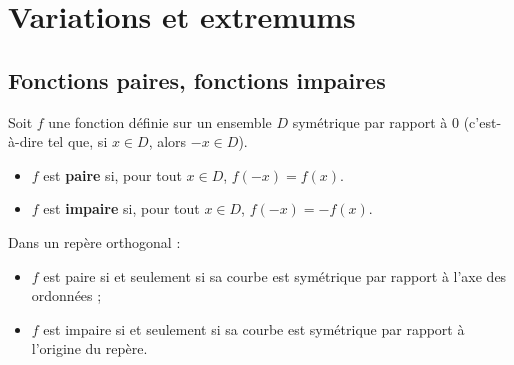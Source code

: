 \chapter{Variations et extremums}

\section{Fonctions paires, fonctions impaires}

\begin{defin}
	Soit $f$ une fonction définie sur un ensemble $D$ symétrique par rapport à $0$ (c'est-à-dire tel que, si $x \in D$, alors $-x \in D$).
	\begin{itemize}
		\item $f$ est \textbf{paire} si, pour tout $x \in D$, $f(-x) = f(x)$.
		\item $f$ est \textbf{impaire} si, pour tout $x \in D$, $f(-x) = -f(x)$.
	\end{itemize}
\end{defin}

\begin{propriete}
	Dans un repère orthogonal :
	\begin{itemize}
		\item $f$ est paire si et seulement si sa courbe est symétrique par rapport à l'axe des ordonnées ;
		\item $f$ est impaire si et seulement si sa courbe est symétrique par rapport à l'origine du repère.
	\end{itemize}
\end{propriete}

